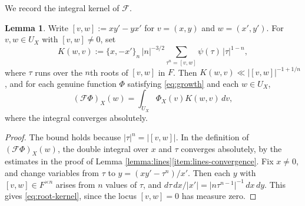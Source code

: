 \documentclass[reqno]{amsart}
\theoremstyle{plain}
\theoremstyle{definition}
\theoremstyle{itplain}
\newtheorem{lemma}[theorem]{Lemma}
\numberwithin{equation}{section}
\numberwithin{theorem}{section}
\begin{document}
We record the integral kernel of $\mathcal{F}$.
\begin{lemma}\label{lemma:root-kernel}
  Write $[v, w] := x y' - y x'$ for $v = (x, y)$ and $w = (x', y')$.  For $v, w \in U_X$ with $[v, w] \neq 0$, set
  \begin{equation*}
    K(w, v) := \{x, -x'\}_n \, \lvert n \rvert^{-3/2} \sum_{\tau^n = [v, w]} \psi(\tau) \, \lvert \tau \rvert^{1-n},
  \end{equation*}
  where $\tau$ runs over the $n$th roots of $[v, w]$ in $F$.  Then $K(w, v) \ll \lvert [v, w] \rvert^{-1 + 1/n}$, and for each genuine function $\Phi$ satisfying \eqref{eq:growth} and each $w \in U_X$,
  \begin{equation}\label{eq:root-kernel}
    (\mathcal{F} \Phi)_X(w) = \int_{U_X} \Phi_X(v) K(w, v) \, d v,
  \end{equation}
  where the integral converges absolutely.
\end{lemma}
\begin{proof}
  The bound holds because $\lvert \tau \rvert^n = \lvert [v, w] \rvert$.  In the definition of $(\mathcal{F} \Phi)_X(w)$, the double integral over $x$ and $\tau$ converges absolutely, by the estimates in the proof of Lemma \ref{lemma:lines}\eqref{item:lines-convergence}.  Fix $x \neq 0$, and change variables from $\tau$ to $y = (x y' - \tau^n) / x'$.  Then each $y$ with $[v, w] \in F^{\times n}$ arises from $n$ values of $\tau$, and $d \tau \, d x / \lvert x' \rvert = \lvert n \tau^{n-1} \rvert^{-1} \, d x \, d y$.  This gives \eqref{eq:root-kernel}, since the locus $[v, w] = 0$ has measure zero.
\end{proof}
\end{document}

